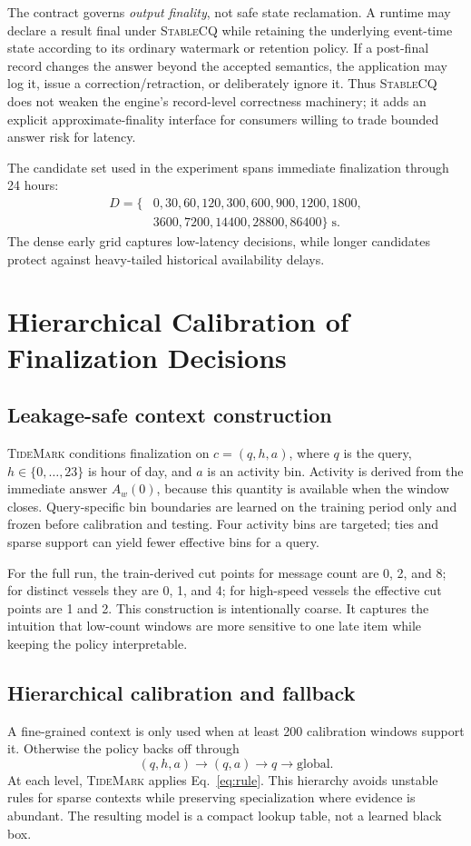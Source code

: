 \documentclass[conference]{IEEEtran}
\newcommand{\stablecq}{\textsc{StableCQ}}
\newcommand{\tidemark}{\textsc{TideMark}}
\begin{document}
The contract governs \emph{output finality}, not safe state reclamation. A runtime may declare a result final under \stablecq{} while retaining the underlying event-time state according to its ordinary watermark or retention policy. If a post-final record changes the answer beyond the accepted semantics, the application may log it, issue a correction/retraction, or deliberately ignore it. Thus \stablecq{} does not weaken the engine's record-level correctness machinery; it adds an explicit approximate-finality interface for consumers willing to trade bounded answer risk for latency.

The candidate set used in the experiment spans immediate finalization through 24 hours:
\begin{align*}
D=\{&0,30,60,120,300,600,900,1200,1800,\\
&3600,7200,14400,28800,86400\}\;\text{s}.
\end{align*}
The dense early grid captures low-latency decisions, while longer candidates protect against heavy-tailed historical availability delays.

\section{Hierarchical Calibration of Finalization Decisions}
\subsection{Leakage-safe context construction}
\tidemark{} conditions finalization on $c=(q,h,a)$, where $q$ is the query, $h\in\{0,\ldots,23\}$ is hour of day, and $a$ is an activity bin. Activity is derived from the immediate answer $A_w(0)$, because this quantity is available when the window closes. Query-specific bin boundaries are learned on the training period only and frozen before calibration and testing. Four activity bins are targeted; ties and sparse support can yield fewer effective bins for a query.

For the full run, the train-derived cut points for message count are 0, 2, and 8; for distinct vessels they are 0, 1, and 4; for high-speed vessels the effective cut points are 1 and 2. This construction is intentionally coarse. It captures the intuition that low-count windows are more sensitive to one late item while keeping the policy interpretable.

\subsection{Hierarchical calibration and fallback}
A fine-grained context is only used when at least 200 calibration windows support it. Otherwise the policy backs off through
\begin{equation}
(q,h,a)\rightarrow(q,a)\rightarrow q\rightarrow \text{global}.
\end{equation}
At each level, \tidemark{} applies Eq.~\eqref{eq:rule}. This hierarchy avoids unstable rules for sparse contexts while preserving specialization where evidence is abundant. The resulting model is a compact lookup table, not a learned black box.
\end{document}
